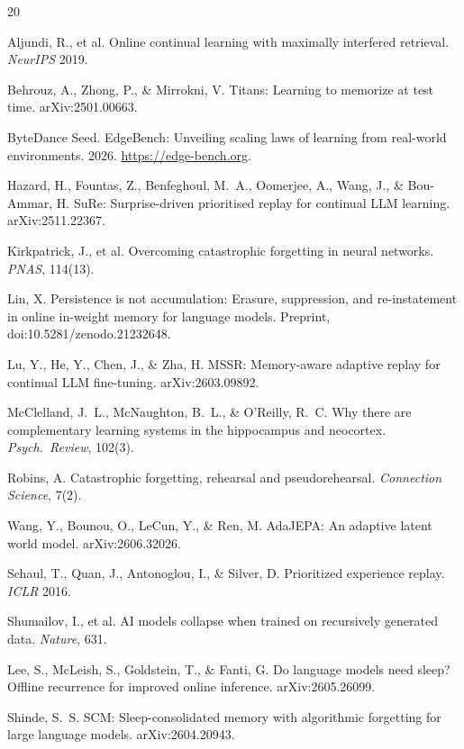 \documentclass[11pt]{article}
\begin{document}
\begin{thebibliography}{20}\small

 Aljundi, R., et al. Online continual learning with
maximally interfered retrieval. \emph{NeurIPS} 2019.

 Behrouz, A., Zhong, P., \& Mirrokni, V. Titans:
Learning to memorize at test time. arXiv:2501.00663.

 ByteDance Seed. EdgeBench: Unveiling scaling laws of
learning from real-world environments. 2026. \url{https://edge-bench.org}.

 Hazard, H., Fountas, Z., Benfeghoul, M.~A., Oomerjee, A.,
Wang, J., \& Bou-Ammar, H. SuRe: Surprise-driven prioritised replay for continual LLM learning.
arXiv:2511.22367.

 Kirkpatrick, J., et al. Overcoming catastrophic
forgetting in neural networks. \emph{PNAS}, 114(13).

 Lin, X. Persistence is not accumulation: Erasure,
suppression, and re-instatement in online in-weight memory for language models. Preprint,
doi:10.5281/zenodo.21232648.

 Lu, Y., He, Y., Chen, J., \& Zha, H. MSSR: Memory-aware adaptive
replay for continual LLM fine-tuning. arXiv:2603.09892.

 McClelland, J.~L., McNaughton, B.~L., \& O'Reilly,
R.~C. Why there are complementary learning systems in the hippocampus and neocortex. \emph{Psych.\
Review}, 102(3).

 Robins, A. Catastrophic forgetting, rehearsal and pseudorehearsal.
\emph{Connection Science}, 7(2).

 Wang, Y., Bounou, O., LeCun, Y., \& Ren, M. AdaJEPA:
An adaptive latent world model. arXiv:2606.32026.

 Schaul, T., Quan, J., Antonoglou, I., \& Silver, D.
Prioritized experience replay. \emph{ICLR} 2016.

 Shumailov, I., et al. AI models collapse when
trained on recursively generated data. \emph{Nature}, 631.

 Lee, S., McLeish, S., Goldstein, T., \& Fanti, G.
Do language models need sleep? Offline recurrence for improved online inference. arXiv:2605.26099.

 Shinde, S.~S. SCM: Sleep-consolidated memory with algorithmic
forgetting for large language models. arXiv:2604.20943.

\end{thebibliography}
\end{document}
